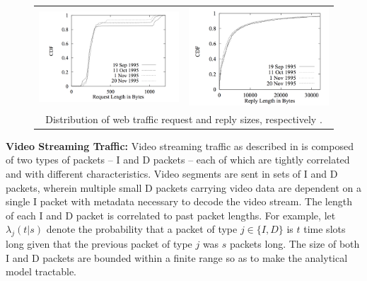 \documentclass{llncs}
\begin{document}
\begin{figure}
\begin{center}
\begin{tabular}{cc}
\includegraphics[scale=0.3]{histogram1.png} & \includegraphics[scale=0.3]{histogram2.png} \\
\multicolumn{2}{c}{Distribution of web traffic request and reply sizes, respectively \cite{mah1997empirical}.}
\end{tabular}
\end{center}
\end{figure}

\noindent
\textbf{Video Streaming Traffic:} Video streaming traffic as described in \cite{badia2010markov} is composed of two types of packets -- I and D packets -- each of which are tightly correlated and with different characteristics. Video segments are sent in sets of I and D packets, wherein multiple small D packets carrying video data are dependent on a single I packet with metadata necessary to decode the video stream. The length of each I and D packet is correlated to past packet lengths. For example, let $\lambda_j(t|s)$ denote the probability that a packet of type $j \in \{I ,D \}$ is $t$ time slots long given that the previous packet of type $j$ was $s$ packets long. The size of both I and D packets are bounded within a finite range so as to make the analytical model tractable. 
\end{document}
